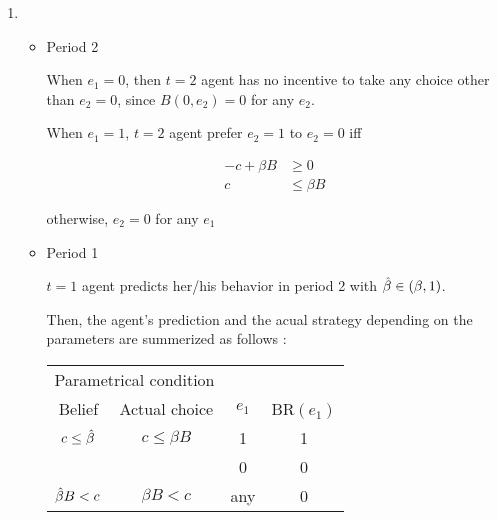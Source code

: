 \documentclass{jsarticle}
\begin{document}
\begin{enumerate}
\begin{enumerate}
\begin{itemize}
\begin{enumerate}
  
  
  \end{enumerate}
 
 \end{itemize}


\item

 \begin{itemize}
 
 \item Period 2
 
 When $e_1=0$, then $t=2$ agent has no incentive to take any choice other than $e_2=0$, since $B(0,e_2)=0$ for any $e_2$.
 
 When $e_1=1$, $t=2$ agent prefer $e_2=1$ to $e_2=0$ iff
 
 \begin{align*}
 - c + \beta B &\geq 0 \\
 c & \leq \beta B
 \end{align*}
 
 otherwise, $e_2=0$ for any $e_1$
 
 \item Period 1
 
 $t=1$ agent predicts her/his behavior in period 2 with $\Hat{\beta} \in (\beta, 1)$.
 
 Then, the agent's prediction and the acual strategy depending on the parameters are summerized as follows :
 
  \begin{center}
  
  \begin{tabular}{cccc} \hline
 \multicolumn{2}{c}{Parametrical condition} & & \\
 \multicolumn{1}{c}{Belief} & \multicolumn{1}{c}{Actual choice} & $e_1$ & BR$(e_1)$ \\ \hline
 $c \leq \Hat{\beta}$ & $c \leq \beta B$ & 1 & 1 \\
  & & 0 & 0 \\
 $\Hat{\beta} B < c $ & $\beta B <c$ & any & 0 \\ \hline
  \end{tabular}
  
  \end{center}
  
  \vspace{1zw}
 
 \end{itemize}

 \begin{enumerate}
 

\end{enumerate}
\end{enumerate}
\end{enumerate}
\end{document}
